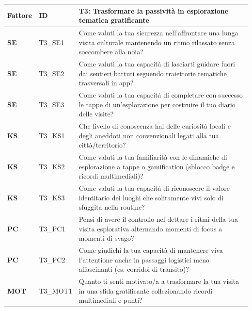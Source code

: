 \begin{table}[H]
    \centering
    \small
    \renewcommand{\arraystretch}{1.3}
    \begin{tabular}{
        |>{\centering\arraybackslash\bfseries}p{1.5cm}
        |>{\centering\arraybackslash}p{2.2cm}
        |>{\raggedright\arraybackslash}p{9.8cm}|
    }
        \hline
        \rowcolor{culturiaRed}
        \textcolor{culturiaWhite}{\textbf{Fattore}} &
        \textcolor{culturiaWhite}{\textbf{ID}} &
        \textcolor{culturiaWhite}{\textbf{T3: Trasformare la passività in esplorazione tematica gratificante}} \\
        \hline
        \rowcolor{culturiaBeige}
        SE & T3\_SE1 & Come valuti la tua sicurezza nell'affrontare una lunga visita culturale mantenendo un ritmo rilassato senza soccombere alla noia? \\
        \hline
        SE & T3\_SE2 & Come valuti la tua capacità di lasciarti guidare fuori dai sentieri battuti seguendo traiettorie tematiche trasversali in app? \\
        \hline
        \rowcolor{culturiaBeige}
        SE & T3\_SE3 & Come valuti la tua capacità di completare con successo le tappe di un'esplorazione per costruire il tuo diario delle visite? \\
        \hline
        KS & T3\_KS1 & Che livello di conoscenza hai delle curiosità locali e degli aneddoti non convenzionali legati alla tua città/territorio? \\
        \hline
        \rowcolor{culturiaBeige}
        KS & T3\_KS2 & Come valuti la tua familiarità con le dinamiche di esplorazione a tappe o gamification (sblocco badge e ricordi multimediali)? \\
        \hline
        KS & T3\_KS3 & Come valuti la tua capacità di riconoscere il valore identitario dei luoghi che solitamente vivi solo di sfuggita nella routine? \\
        \hline
        \rowcolor{culturiaBeige}
        PC & T3\_PC1 & Pensi di avere il controllo nel dettare i ritmi della tua visita esplorativa alternando momenti di focus a momenti di svago? \\
        \hline
        PC & T3\_PC2 & Come giudichi la tua capacità di mantenere viva l'attentione anche in passaggi logistici meno affascinanti (es. corridoi di transito)? \\
        \hline
        \rowcolor{culturiaBeige}
        MOT & T3\_MOT1 & Quanto ti senti motivato/a a trasformare la tua visita in una sfida gratificante collezionando ricordi multimediali e punti? \\

\end{tabular}
\end{table}
